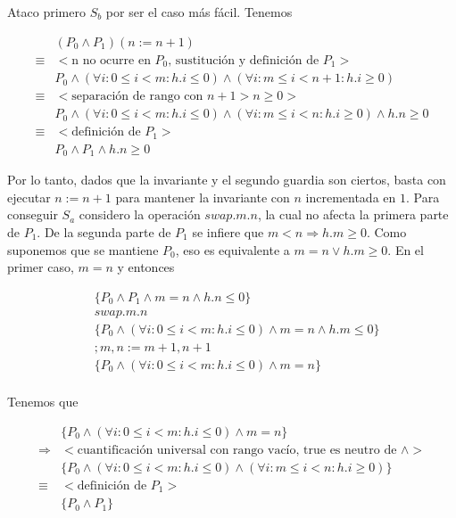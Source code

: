 \documentclass{article}
\begin{document}
Ataco primero $S_b$ por ser el caso más fácil. Tenemos

\begin{align*}
 & (P_0 \wedge P_1)(n := n + 1) \\
 \equiv & <\text{n no ocurre en } P_0\text{, sustitución y definición de } P_1> \\
 & P_0 \wedge (\forall i : 0 \leq i < m : h.i \leq 0) \wedge (\forall i : m \leq i < n+1 : h.i \geq 0) \\
 \equiv & <\text{separación de rango con } n+1 > n \geq 0> \\
 & P_0 \wedge (\forall i : 0 \leq i < m : h.i \leq 0) \wedge (\forall i : m \leq i < n : h.i \geq 0) \wedge h.n \geq 0 \\
 \equiv & <\text{definición de } P_1> \\
 & P_0 \wedge P_1 \wedge h.n \geq 0
\end{align*}

Por lo tanto, dados que la invariante y el segundo guardia
son ciertos, basta con ejecutar $n := n + 1$ para mantener la invariante con
$n$ incrementada en $1$. Para conseguir $S_a$ considero la operación
$swap.m.n$, la cual no afecta la primera parte de $P_1$.
De la segunda parte de $P_1$ se infiere que
$m < n \Rightarrow h.m \geq 0$. Como suponemos que se mantiene $P_0$, eso
es equivalente a $m = n \vee h.m \geq 0$. En el primer caso, $m = n$ y
entonces

\begin{align*}
 & \{P_0 \wedge P_1 \wedge m = n \wedge h.n \leq 0\} \\
 & swap.m.n \\
 & \{P_0 \wedge (\forall i : 0 \leq i < m : h.i \leq 0) \wedge m = n \wedge h.m \leq 0\} \\
 & ;m, n := m+1, n+1 \\
 & \{P_0 \wedge (\forall i : 0 \leq i < m : h.i \leq 0) \wedge m = n\} \\
\end{align*}

Tenemos que

\begin{align*}
 & \{P_0 \wedge (\forall i : 0 \leq i < m : h.i \leq 0) \wedge m = n\} \\
 \Rightarrow & <\text{cuantificación universal con rango vacío, true es neutro de } \wedge> \\
 & \{P_0 \wedge (\forall i : 0 \leq i < m : h.i \leq 0) \wedge (\forall i : m \leq i < n : h.i \geq 0)\} \\
 \equiv & <\text{definición de } P_1> \\
 & \{P_0 \wedge P_1\} \\
\end{align*}
\end{document}
